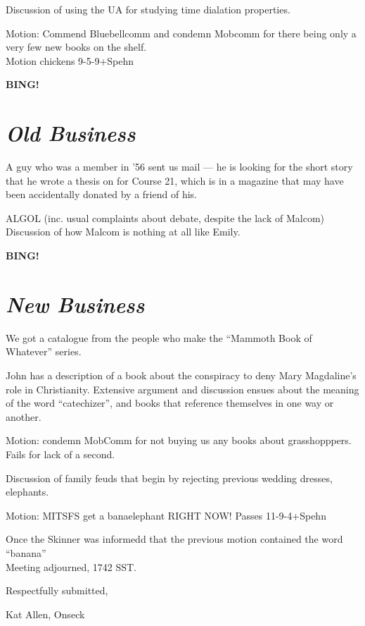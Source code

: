 \documentclass[10pt]{article}
\newcommand{\bing}{{\bf BING!} }
\newcommand{\goto}[1]{\bing \vskip 12pt \section*{{\em{#1}}}}
\begin{document}
Discussion of using the UA for studying time dialation properties.

Motion: Commend Bluebellcomm and condemn Mobcomm for there being only
a very few new books on the shelf.\\
Motion chickens 9-5-9+Spehn

\goto{Old Business}

A guy who was a member in '56 sent us mail --- he is looking for the
short story that he wrote a thesis on for Course 21, which is in a
magazine that may have been accidentally donated by a friend of his.

ALGOL (inc. usual complaints about debate, despite the lack of Malcom)
Discussion of how Malcom is nothing at all like Emily.

\goto{New Business}
We got a catalogue from the people who make the ``Mammoth Book of
Whatever'' series.

John has a description of a book about the conspiracy to deny Mary
Magdaline's role in Christianity.  Extensive argument and discussion
ensues about the meaning of the word ``catechizer'', and books that
reference themselves in one way or another.

Motion: condemn MobComm for not buying us any books about
grasshopppers.\\
Fails for lack of a second.

Discussion of family feuds that begin by rejecting previous wedding
dresses, elephants.

Motion: MITSFS get a banaelephant RIGHT NOW!
Passes 11-9-4+Spehn

\vspace{12pt}

\noindent
Once the Skinner was informedd that the previous motion contained the
word ``banana''\\
Meeting adjourned, 1742 SST.

\vspace{18pt}

\centerline{Respectfully submitted,}
\centerline{Kat Allen,  Onseck}
\end{document}
